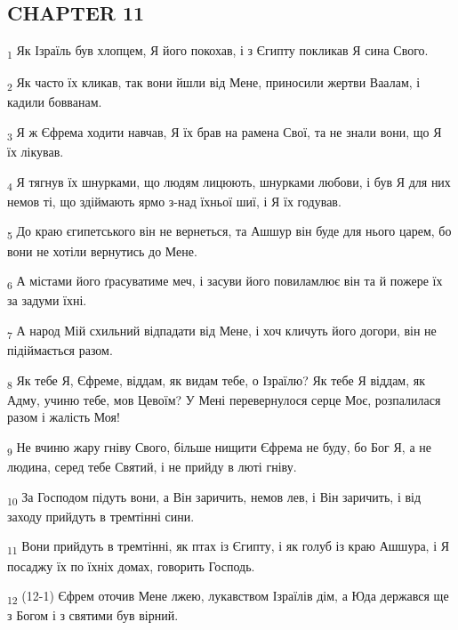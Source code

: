 \subsection{CHAPTER 11}
\begin{tcolorbox}
\textsubscript{1} Як Ізраїль був хлопцем, Я його покохав, і з Єгипту покликав Я сина Свого.
\end{tcolorbox}
\begin{tcolorbox}
\textsubscript{2} Як часто їх кликав, так вони йшли від Мене, приносили жертви Ваалам, і кадили бовванам.
\end{tcolorbox}
\begin{tcolorbox}
\textsubscript{3} Я ж Єфрема ходити навчав, Я їх брав на рамена Свої, та не знали вони, що Я їх лікував.
\end{tcolorbox}
\begin{tcolorbox}
\textsubscript{4} Я тягнув їх шнурками, що людям лицюють, шнурками любови, і був Я для них немов ті, що здіймають ярмо з-над їхньої шиї, і Я їх годував.
\end{tcolorbox}
\begin{tcolorbox}
\textsubscript{5} До краю єгипетського він не вернеться, та Ашшур він буде для нього царем, бо вони не хотіли вернутись до Мене.
\end{tcolorbox}
\begin{tcolorbox}
\textsubscript{6} А містами його ґрасуватиме меч, і засуви його повиламлює він та й пожере їх за задуми їхні.
\end{tcolorbox}
\begin{tcolorbox}
\textsubscript{7} А народ Мій схильний відпадати від Мене, і хоч кличуть його догори, він не підіймається разом.
\end{tcolorbox}
\begin{tcolorbox}
\textsubscript{8} Як тебе Я, Єфреме, віддам, як видам тебе, о Ізраїлю? Як тебе Я віддам, як Адму, учиню тебе, мов Цевоїм? У Мені перевернулося серце Моє, розпалилася разом і жалість Моя!
\end{tcolorbox}
\begin{tcolorbox}
\textsubscript{9} Не вчиню жару гніву Свого, більше нищити Єфрема не буду, бо Бог Я, а не людина, серед тебе Святий, і не прийду в люті гніву.
\end{tcolorbox}
\begin{tcolorbox}
\textsubscript{10} За Господом підуть вони, а Він заричить, немов лев, і Він заричить, і від заходу прийдуть в тремтінні сини.
\end{tcolorbox}
\begin{tcolorbox}
\textsubscript{11} Вони прийдуть в тремтінні, як птах із Єгипту, і як голуб із краю Ашшура, і Я посаджу їх по їхніх домах, говорить Господь.
\end{tcolorbox}
\begin{tcolorbox}
\textsubscript{12} (12-1) Єфрем оточив Мене лжею, лукавством Ізраїлів дім, а Юда держався ще з Богом і з святими був вірний.
\end{tcolorbox}
